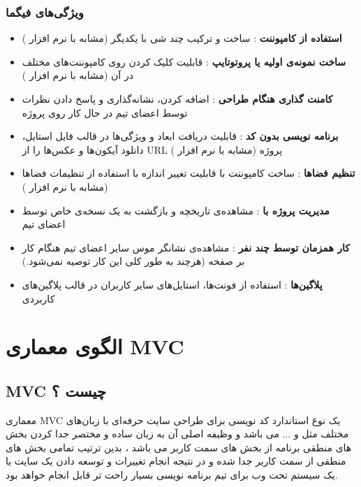 \subsubsection{ویژگی‌های فیگما}
\begin{itemize}
	\item 
	\textbf{استفاده از کامپوننت}
	: ساخت و ترکیب چند شی با یکدیگر (مشابه با نرم افزار )
	\item 
	\textbf{ساخت نمونه‌ی اولیه یا پروتوتایپ}
	: قابلیت کلیک کردن روی کامپوننت‌های مختلف در آن (مشابه با نرم افزار )
	\item 
	\textbf{کامنت گذاری هنگام طراحی}
	: اضافه کردن، نشانه‌گذاری و پاسخ دادن نظرات توسط اعضای تیم در حال کار روی پروژه
	\item 
	\textbf{برنامه نویسی بدون کد}
	: قابلیت دریافت ابعاد و ویژگی‌ها در قالب فایل استایل‌، دانلود آیکون‌ها و عکس‌ها را از URL پروژه (مشابه با نرم افزار )
	\item 
	\textbf{تنظیم فضا‌ها}
	: ساخت کامپوننت‌ با قابلیت تغییر اندازه با استفاده از تنظیمات فضاها (مشابه با نرم افزار )
	\item 
	\textbf{مدیریت پروژه با 
		}
	: مشاهده‌ی تاریخچه و بازگشت به یک نسخه‌ی خاص توسط اعضای تیم
	\item 
	\textbf{کار همزمان توسط چند نفر}
	: مشاهده‌ی نشانگر موس سایر اعضای تیم هنگام کار بر صفحه (هرچند به طور کلی این کار توصیه نمی‌شود.)
	\item 
	\textbf{پلاگین‌ها}
	: استفاده از فونت‌ها، استایل‌های سایر کاربران در قالب پلاگین‌های کاربردی
\end{itemize}


\section{الگوی معماری MVC}
\subsection{MVC‌ چیست ؟}
معماری 
MVC
 یک نوع استاندارد کد نویسی برای طراحی سایت حرفه‌ای با زبان‌های مختلف مثل
 و ... می باشد و وظیفه اصلی آن به زبان ساده و مختصر جدا کردن بخش های منطقی برنامه از بخش های سمت کاربر می باشد ، بدین ترتیب تمامی بخش های منطقی از سمت کاربر جدا شده و در نتیجه انجام تغییرات و توسعه دادن یک سایت یا یک سیستم تحت وب برای تیم برنامه نویسی بسیار راحت تر قابل انجام خواهد بود.

